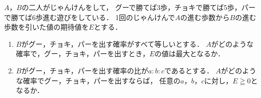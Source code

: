 \documentclass[../../main.tex]{subfiles}
\begin{document}
$A$，$B$の二人がじゃんけんをして，
グーで勝てば3歩，チョキで勝てば5歩，パーで勝てば6歩進む遊びをしている．
1回のじゃんけんで$A$の進む歩数から$B$の進む歩数を引いた値の期待値を$E$とする．
\begin{enumerate}
  \item $B$がグー，チョキ，パーを出す確率がすべて等しいとする．
    $A$がどのような確率で，グー，チョキ，パーを出すとき，$E$の値は最大となるか．
  \item $B$がグー，チョキ，パーを出す確率の比が$a:b:c$であるとする．
    $A$がどのような確率でグー，チョキ，パーを出すならば，
    任意の$a$，$b$，$c$に対し，$E\geqq0$となるか．
\end{enumerate}
\end{document}
